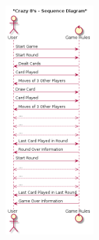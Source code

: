 \begin{center}
  \includegraphics[width=0.25\textwidth]{PlayerAPI/SequenceDiagrams/EightsUML.png}
\end{center}
